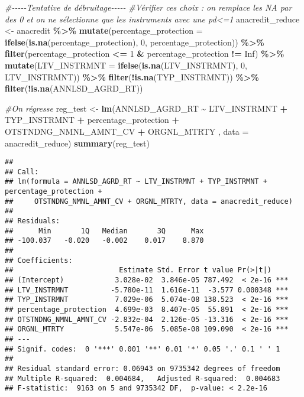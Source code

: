 \documentclass[
]{article}
\newenvironment{Shaded}{\begin{snugshade}}{\end{snugshade}}
\newcommand{\AttributeTok}[1]{\textcolor[rgb]{0.13,0.29,0.53}{#1}}
\newcommand{\CommentTok}[1]{\textcolor[rgb]{0.56,0.35,0.01}{\textit{#1}}}
\newcommand{\ConstantTok}[1]{\textcolor[rgb]{0.56,0.35,0.01}{#1}}
\newcommand{\DecValTok}[1]{\textcolor[rgb]{0.00,0.00,0.81}{#1}}
\newcommand{\FunctionTok}[1]{\textcolor[rgb]{0.13,0.29,0.53}{\textbf{#1}}}
\newcommand{\NormalTok}[1]{#1}
\newcommand{\OtherTok}[1]{\textcolor[rgb]{0.56,0.35,0.01}{#1}}
\newcommand{\SpecialCharTok}[1]{\textcolor[rgb]{0.81,0.36,0.00}{\textbf{#1}}}
\begin{document}
\begin{Shaded}
\begin{Highlighting}[]
\CommentTok{\#{-}{-}{-}{-}{-}Tentative de débruitage{-}{-}{-}{-}{-}}
\CommentTok{\#Vérifier ces choix : on remplace les NA par des 0 et on ne sélectionne que les instruments avec une pd\textless{}=1}
\NormalTok{anacredit\_reduce }\OtherTok{\textless{}{-}}\NormalTok{ anacredit }\SpecialCharTok{\%\textgreater{}\%}
  \FunctionTok{mutate}\NormalTok{(}\AttributeTok{percentage\_protection =} \FunctionTok{ifelse}\NormalTok{(}\FunctionTok{is.na}\NormalTok{(percentage\_protection), }\DecValTok{0}\NormalTok{, percentage\_protection)) }\SpecialCharTok{\%\textgreater{}\%}
  \FunctionTok{filter}\NormalTok{(percentage\_protection }\SpecialCharTok{\textless{}=} \DecValTok{1} \SpecialCharTok{\&}\NormalTok{ percentage\_protection }\SpecialCharTok{!=} \ConstantTok{Inf}\NormalTok{) }\SpecialCharTok{\%\textgreater{}\%}
  \FunctionTok{mutate}\NormalTok{(}\AttributeTok{LTV\_INSTRMNT =} \FunctionTok{ifelse}\NormalTok{(}\FunctionTok{is.na}\NormalTok{(LTV\_INSTRMNT), }\DecValTok{0}\NormalTok{, LTV\_INSTRMNT)) }\SpecialCharTok{\%\textgreater{}\%}
  \FunctionTok{filter}\NormalTok{(}\SpecialCharTok{!}\FunctionTok{is.na}\NormalTok{(TYP\_INSTRMNT)) }\SpecialCharTok{\%\textgreater{}\%}
  \FunctionTok{filter}\NormalTok{(}\SpecialCharTok{!}\FunctionTok{is.na}\NormalTok{(ANNLSD\_AGRD\_RT))}

\CommentTok{\#On régresse}
\NormalTok{reg\_test }\OtherTok{\textless{}{-}} \FunctionTok{lm}\NormalTok{(ANNLSD\_AGRD\_RT }\SpecialCharTok{\textasciitilde{}}\NormalTok{ LTV\_INSTRMNT }\SpecialCharTok{+}\NormalTok{ TYP\_INSTRMNT }\SpecialCharTok{+}  
\NormalTok{                 percentage\_protection }\SpecialCharTok{+}\NormalTok{ OTSTNDNG\_NMNL\_AMNT\_CV }\SpecialCharTok{+}\NormalTok{ ORGNL\_MTRTY}
\NormalTok{                 , }\AttributeTok{data =}\NormalTok{ anacredit\_reduce)}
\FunctionTok{summary}\NormalTok{(reg\_test)}
\end{Highlighting}
\end{Shaded}

\begin{verbatim}
## 
## Call:
## lm(formula = ANNLSD_AGRD_RT ~ LTV_INSTRMNT + TYP_INSTRMNT + percentage_protection + 
##     OTSTNDNG_NMNL_AMNT_CV + ORGNL_MTRTY, data = anacredit_reduce)
## 
## Residuals:
##      Min       1Q   Median       3Q      Max 
## -100.037   -0.020   -0.002    0.017    8.870 
## 
## Coefficients:
##                         Estimate Std. Error t value Pr(>|t|)    
## (Intercept)            3.028e-02  3.846e-05 787.492  < 2e-16 ***
## LTV_INSTRMNT          -5.780e-11  1.616e-11  -3.577 0.000348 ***
## TYP_INSTRMNT           7.029e-06  5.074e-08 138.523  < 2e-16 ***
## percentage_protection  4.699e-03  8.407e-05  55.891  < 2e-16 ***
## OTSTNDNG_NMNL_AMNT_CV -2.832e-04  2.126e-05 -13.316  < 2e-16 ***
## ORGNL_MTRTY            5.547e-06  5.085e-08 109.090  < 2e-16 ***
## ---
## Signif. codes:  0 '***' 0.001 '**' 0.01 '*' 0.05 '.' 0.1 ' ' 1
## 
## Residual standard error: 0.06943 on 9735342 degrees of freedom
## Multiple R-squared:  0.004684,   Adjusted R-squared:  0.004683 
## F-statistic:  9163 on 5 and 9735342 DF,  p-value: < 2.2e-16
\end{verbatim}
\end{document}
